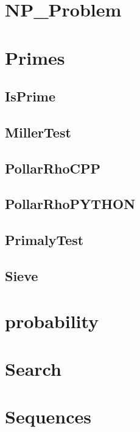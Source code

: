 \section{NP_Problem}

\section{Primes}
\subsection{ IsPrime}
\raggedbottom
\hrulefill
\subsection{ MillerTest}
\raggedbottom
\hrulefill
\subsection{ PollarRhoCPP}
\raggedbottom
\hrulefill
\subsection{ PollarRhoPYTHON}
\raggedbottom
\hrulefill
\subsection{ PrimalyTest}
\raggedbottom
\hrulefill
\subsection{ Sieve}
\raggedbottom
\hrulefill

\section{probability}

\section{Search}

\section{Sequences}

